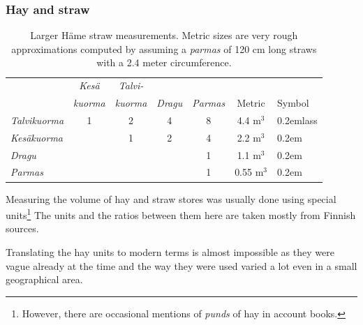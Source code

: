 \documentclass[a4paper]{article}
\newcommand{\samplefont}{\fontsize{16}{16}\abcursivefamily\spaceskip0.2em}
\newcommand{\sample}[1]{{\samplefont #1 \strut}}
\begin{document}
\subsubsection{Hay and straw} 






 \begin{table}
   \centering
   \begin{tabular}{lcccc|cl}
        & \emph{Kesä} & \emph{Talvi- } \\
        & \emph{kuorma} & \emph{kuorma} & \emph{Dragu} &  \emph{Parmas} & Metric & Symbol \\
     \hline
     \emph{Talvikuorma} & 1 & 2 & 4 & 8 & 4.4 m$^3$ &  \sample{lass} \\
     \emph{Kesäkuorma}  &   & 1 & 2 & 4 & 2.2 m$^3$ &  \sample{\absommarlass} \\
     \emph{Dragu}       &   &   &   & 1 & 1.1 m$^3$ &  \sample{\abdragu} \\
     \emph{Parmas}      &   &  &   &  1 & 0.55 m$^3$ &  \sample{\abparmas} \\
   \end{tabular}
   \caption{Larger Häme straw measurements. Metric sizes are very
     rough approximations computed by assuming a \emph{parmas} of 120
     cm long straws with a 2.4 meter circumference. }
   \label{tab_hay}
 \end{table}

Measuring the volume of hay and straw stores was usually done using
special units\footnote{However, there are occasional mentions of
  \emph{punds} of hay in account books.} The units and the ratios
between them here are taken mostly from Finnish sources. 

Translating the hay units to modern terms is almost impossible as they
were vague already at the time and the way they were used varied a lot
even in a small geographical area. 
\end{document}
